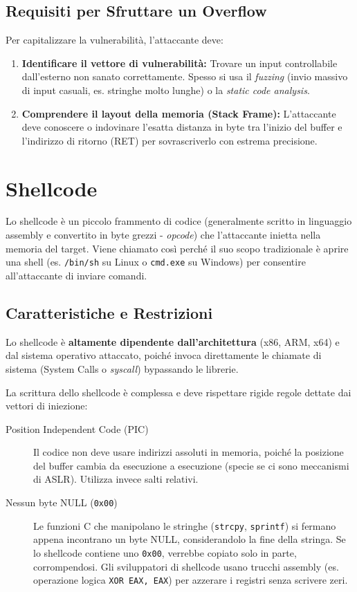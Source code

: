 \subsection{Requisiti per Sfruttare un Overflow}
Per capitalizzare la vulnerabilità, l'attaccante deve:
\begin{enumerate}
    \item \textbf{Identificare il vettore di vulnerabilità:} Trovare un input controllabile dall'esterno non sanato correttamente. Spesso si usa il \textit{fuzzing} (invio massivo di input casuali, es. stringhe molto lunghe) o la \textit{static code analysis}.
    \item \textbf{Comprendere il layout della memoria (Stack Frame):} L'attaccante deve conoscere o indovinare l'esatta distanza in byte tra l'inizio del buffer e l'indirizzo di ritorno (RET) per sovrascriverlo con estrema precisione.
\end{enumerate}

\section{Shellcode}
\begin{defbox}[Shellcode]
Lo shellcode è un piccolo frammento di codice (generalmente scritto in linguaggio assembly e convertito in byte grezzi - \textit{opcode}) che l'attaccante inietta nella memoria del target. Viene chiamato così perché il suo scopo tradizionale è aprire una shell (es. \texttt{/bin/sh} su Linux o \texttt{cmd.exe} su Windows) per consentire all'attaccante di inviare comandi.
\end{defbox}

\subsection{Caratteristiche e Restrizioni}
Lo shellcode è \textbf{altamente dipendente dall'architettura} (x86, ARM, x64) e dal sistema operativo attaccato, poiché invoca direttamente le chiamate di sistema (System Calls o \textit{syscall}) bypassando le librerie. 

La scrittura dello shellcode è complessa e deve rispettare rigide regole dettate dai vettori di iniezione:
\begin{description}
    \item[Position Independent Code (PIC)] Il codice non deve usare indirizzi assoluti in memoria, poiché la posizione del buffer cambia da esecuzione a esecuzione (specie se ci sono meccanismi di ASLR). Utilizza invece salti relativi.
    \item[Nessun byte NULL (\texttt{0x00})] Le funzioni C che manipolano le stringhe (\texttt{strcpy}, \texttt{sprintf}) si fermano appena incontrano un byte NULL, considerandolo la fine della stringa. Se lo shellcode contiene uno \texttt{0x00}, verrebbe copiato solo in parte, corrompendosi. Gli sviluppatori di shellcode usano trucchi assembly (es. operazione logica \texttt{XOR EAX, EAX}) per azzerare i registri senza scrivere zeri.
\end{description}

